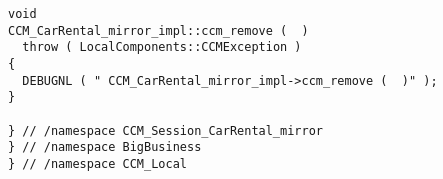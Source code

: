 \begin{scriptsize}
\begin{verbatim}
void
CCM_CarRental_mirror_impl::ccm_remove (  )
  throw ( LocalComponents::CCMException )
{
  DEBUGNL ( " CCM_CarRental_mirror_impl->ccm_remove (  )" );
}

} // /namespace CCM_Session_CarRental_mirror
} // /namespace BigBusiness
} // /namespace CCM_Local
\end{verbatim}
\end{scriptsize}
